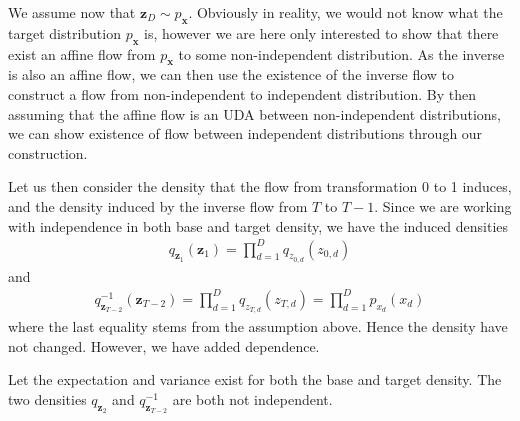 We assume now that \(\bm z_D \sim p_{\bm x}\). Obviously in reality, we would not know what the
target distribution \(p_{\bm x}\) is, however we are here only interested to show that there
exist an affine flow from \(p_{\bm x}\) to some non-independent distribution. As the inverse is also an affine flow,
we can then use the existence of the inverse flow to construct a flow from non-independent to independent distribution. 
By then assuming that the affine flow is an UDA between non-independent distributions, we can show existence
of flow between independent distributions through our construction.

Let us then consider the density that the flow from transformation 0 to 1 induces, and the density 
induced by the inverse flow from \(T\) to \(T-1\). Since we are working with independence in both base and target density,
we have the induced densities
\begin{align*}
    q_{\bm z_1}(\bm z_1) = \prod_{d=1}^D q_{z_{0,d}}(z_{0,d})
\end{align*}
and
\begin{align*}
    q^{-1}_{\bm z_{T-2}}(\bm z_{T-2}) = \prod_{d=1}^D q_{z_{T,d}}(z_{T,d}) = \prod_{d=1}^D p_{x_{d}}(x_{d})
\end{align*}
where the last equality stems from the assumption above. Hence the density have not changed. However, we have 
added dependence.
\begin{lemma}\label{lemma:corr_densi}
    Let the expectation and variance exist for both the base and target density. 
    The two densities \(q_{\bm z_2}\) and \(q^{-1}_{\bm z_{T-2}}\) are both
    not independent.
\end{lemma}
